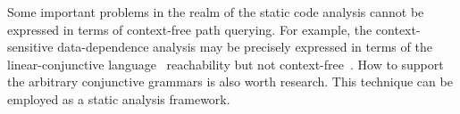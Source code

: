 
Some important problems in the realm of the static code analysis cannot be expressed in terms of context-free path querying. 
For example, the context-sensitive data-dependence analysis may be precisely expressed in terms of the linear-conjunctive language~\cite{Okhotin2003LCL} reachability but not context-free~\cite{LCLReachability}.
How to support the arbitrary conjunctive grammars is also worth research. 
This technique can be employed as a static analysis framework. 


